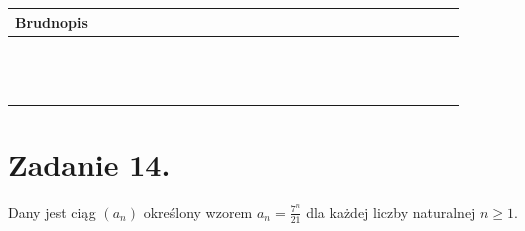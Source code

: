 \documentclass[10pt]{article}
\begin{document}
\begin{center}
\begin{tabular}{|c|c|c|c|c|c|c|c|c|c|c|c|c|c|c|c|c|c|c|c|c|c|c|c|c|c|c|c|c|c|c|c|}
\hline
\multicolumn{6}{|l|}{Brudnopis} &  &  &  &  &  &  &  &  &  &  &  &  &  &  &  &  &  &  &  &  &  &  &  &  &  &  \\
\hline
 &  &  &  &  &  &  &  &  &  &  &  &  &  &  &  &  &  &  &  &  &  &  &  &  &  &  &  &  &  &  &  \\
\hline
 &  &  &  &  &  &  &  &  &  &  &  &  &  &  &  &  &  &  &  &  &  &  &  &  &  &  &  &  &  &  &  \\
\hline
 &  &  &  &  &  &  &  &  &  &  &  &  &  &  &  &  &  &  &  &  &  &  &  &  &  &  &  &  &  &  &  \\
\hline
 &  &  &  &  &  &  &  &  &  &  &  &  &  &  &  &  &  &  &  &  &  &  &  &  &  &  &  &  &  &  &  \\
\hline
 &  &  &  &  &  &  &  &  &  &  &  &  &  &  &  &  &  &  &  &  &  &  &  &  &  &  &  &  &  &  &  \\
\hline
 &  &  &  &  &  &  &  &  &  &  &  &  &  &  &  &  &  &  &  &  &  &  &  &  &  &  &  &  &  &  &  \\
\hline
 &  &  &  &  &  &  &  &  &  &  &  &  &  &  &  &  &  &  &  &  &  &  &  &  &  &  &  &  &  &  &  \\
\hline
 &  &  &  &  &  &  &  &  &  &  &  &  &  &  &  &  &  &  &  &  &  &  &  &  &  &  &  &  &  &  &  \\
\hline
 &  &  &  &  &  &  &  &  &  &  &  &  &  &  &  &  &  &  &  &  &  &  &  &  &  &  &  &  &  &  &  \\
\hline
 &  &  &  &  &  &  &  &  &  &  &  &  &  &  &  &  &  &  &  &  &  &  &  &  &  &  &  &  &  &  &  \\
\hline
 &  &  &  &  &  &  &  &  &  &  &  &  &  &  &  &  &  &  &  &  &  &  &  &  &  &  &  &  &  &  &  \\
\hline
 &  &  &  &  &  &  &  &  &  &  &  &  &  &  &  &  &  &  &  &  &  &  &  &  &  &  &  &  &  &  &  \\
\hline
 &  &  &  &  &  &  &  &  &  &  &  &  &  &  &  &  &  &  &  &  &  &  &  &  &  &  &  &  &  &  &  \\
\hline
\end{tabular}
\end{center}

\section*{Zadanie 14.}
Dany jest ciąg \(\left(a_{n}\right)\) określony wzorem \(a_{n}=\frac{7^{n}}{21}\) dla każdej liczby naturalnej \(n \geq 1\).
\end{document}
